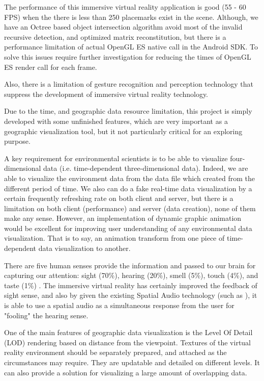 The performance of this immersive virtual reality application is good (55 - 60 FPS) when the there is less than 250 placemarks exist in the scene. Although, we have an Octree based object intersection algorithm avoid most of the invalid recursive detection, and optimized matrix reconstitution, but there is a performance limitation of actual OpenGL ES native call in the Android SDK. To solve this issues require further investigation for reducing the times of OpenGL ES render call for each frame. 

Also, there is a limitation of gesture recognition and perception technology that suppress the development of immersive virtual reality technology.

Due to the time, and geographic data resource limitation, this project is simply developed with some unfinished features, which are very important as a geographic visualization tool, but it not particularly critical for an exploring purpose.

A key requirement for environmental scientists is to be able to visualize four-dimensional data (i.e. time-dependent three-dimensional data). Indeed, we are able to visualize the environment data from the data file which created from the different period of time. We also can do a fake real-time data visualization by a certain frequently refreshing rate on both client and server, but there is a limitation on both client (performance) and server (data creation), none of them make any sense. However, an implementation of dynamic graphic animation would be excellent for improving user understanding of any environmental data visualization. That is to say, an animation transform from one piece of time-dependent data visualization to another.

There are five human senses provide the information and passed to our brain for capturing our attention: sight (70\%), hearing (20\%), smell (5\%), touch (4\%), and taste (1\%) \cite{mazuryk.vr.1996}. The immersive virtual reality has certainly improved the feedback of sight sense, and also by given the existing Spatial Audio technology (such as \cite{google.spatial-audio.2016}), it is able to use a spatial audio as a simultaneous response from the user for "fooling" the hearing sense.

One of the main features of geographic data visualization is the Level Of Detail (LOD) rendering based on distance from the viewpoint. Textures of the virtual reality environment should be separately prepared, and attached as the circumstances may require. They are updatable and detailed on different levels. It can also provide a solution for visualizing a large amount of overlapping data.

